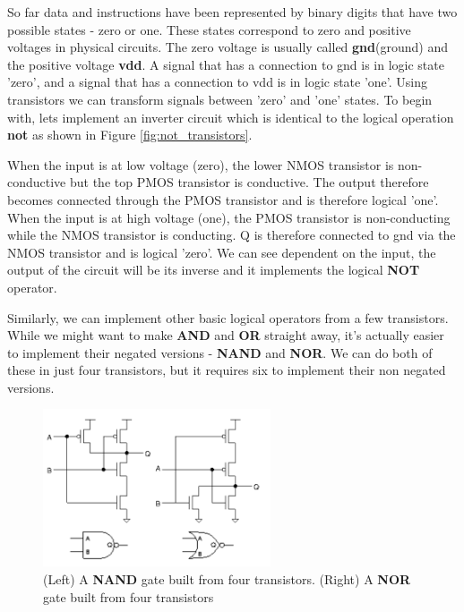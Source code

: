 \documentclass{article}
\begin{document}
	So far data and instructions have been represented by binary digits that have two possible states - zero or one. These states correspond to zero and positive voltages in physical circuits. The zero voltage is usually called \textbf{gnd}(ground) and the positive voltage \textbf{vdd}. A signal that has a connection to gnd is in logic state 'zero', and a signal that has a connection to vdd is in logic state 'one'. Using transistors we can transform signals between 'zero' and 'one' states. To begin with, lets implement an inverter circuit which is identical to the logical operation \textbf{not} as shown in Figure \ref{fig:not_transistors}.	
	
	When the input is at low voltage (zero), the lower NMOS transistor is non-conductive but the top PMOS transistor is conductive. The output therefore becomes connected through the PMOS transistor and is therefore logical 'one'. When the input is at high voltage (one), the PMOS transistor is non-conducting while the NMOS transistor is conducting. Q is therefore connected to gnd via the NMOS transistor and is logical 'zero'. We can see dependent on the input, the output of the circuit will be its inverse and it implements the logical \textbf{NOT} operator.
	
	Similarly, we can implement other basic logical operators from a few transistors. While we might want to make \textbf{AND} and \textbf{OR} straight away, it's actually easier to implement their negated versions - \textbf{NAND} and \textbf{NOR}. We can do both of these in just four transistors, but it requires six to implement their non negated versions.
	
	\begin{figure}[ht]
		\centering
		\includegraphics[width=0.6\textwidth]{nand_nor_transistors}
		\caption{(Left) A \textbf{NAND} gate built from four transistors.  (Right) A \textbf{NOR} gate built from four transistors}
		\label{fig:nand_nor_transistors}
	\end{figure}
	
\end{document}
